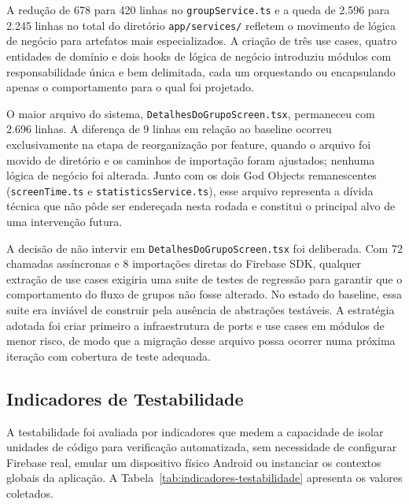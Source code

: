 \documentclass[sigconf,anonymous]{acmart}
\begin{document}
A redução de 678 para 420 linhas no \texttt{groupService.ts} e a queda de 2.596 para 2.245 linhas no total do diretório \texttt{app/services/} refletem o movimento de lógica de negócio para artefatos mais especializados. A criação de três use cases, quatro entidades de domínio e dois hooks de lógica de negócio introduziu módulos com responsabilidade única e bem delimitada, cada um orquestando ou encapsulando apenas o comportamento para o qual foi projetado.

O maior arquivo do sistema, \texttt{DetalhesDoGrupoScreen.tsx}, permaneceu com 2.696 linhas. A diferença de 9 linhas em relação ao baseline ocorreu exclusivamente na etapa de reorganização por feature, quando o arquivo foi movido de diretório e os caminhos de importação foram ajustados; nenhuma lógica de negócio foi alterada. Junto com os dois God Objects remanescentes (\texttt{screenTime.ts} e \texttt{statisticsService.ts}), esse arquivo representa a dívida técnica que não pôde ser endereçada nesta rodada e constitui o principal alvo de uma intervenção futura.

A decisão de não intervir em \texttt{DetalhesDoGrupoScreen.tsx} foi deliberada. Com 72 chamadas assíncronas e 8 importações diretas do Firebase SDK, qualquer extração de use cases exigiria uma suite de testes de regressão para garantir que o comportamento do fluxo de grupos não fosse alterado. No estado do baseline, essa suite era inviável de construir pela ausência de abstrações testáveis. A estratégia adotada foi criar primeiro a infraestrutura de ports e use cases em módulos de menor risco, de modo que a migração desse arquivo possa ocorrer numa próxima iteração com cobertura de teste adequada.

\subsection{Indicadores de Testabilidade}
\label{sec:indicadores-testabilidade}

A testabilidade foi avaliada por indicadores que medem a capacidade de isolar unidades de código para verificação automatizada, sem necessidade de configurar Firebase real, emular um dispositivo físico Android ou instanciar os contextos globais da aplicação. A Tabela~\ref{tab:indicadores-testabilidade} apresenta os valores coletados.
\end{document}
